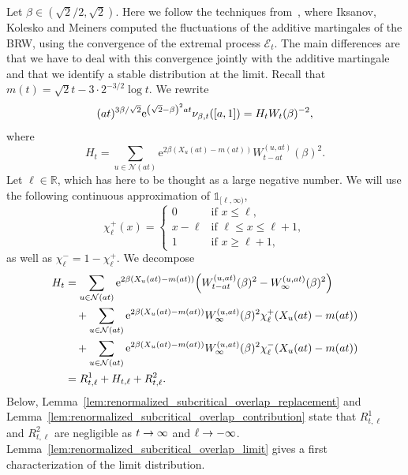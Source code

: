 \documentclass[10pt]{amsart}
\theoremstyle{definition}\newtheorem{defi}[theo]{Definition}\newtheorem{rema}[theo]{Remark}\newtheorem{exam}[theo]{Example}\newtheorem{exem}[theo]{Example}\newtheorem{nota}[theo]{Notation}
\newcommand{\e}{\mathrm{e}}
\newcommand{\R}{\mathbb{R}}
\newcommand\1{\mathds{1}}
\newcommand{\cE}{\mathcal{E}}
\newcommand{\cN}{\mathcal{N}}
\let\originalleft\left
\let\originalright\right
\renewcommand{\left}{\mathopen{}\mathclose\bgroup\originalleft}
\renewcommand{\right}{\aftergroup\egroup\originalright}
\renewcommand*{\to}{\mathchoice{\longrightarrow}{\rightarrow}{\rightarrow}{\rightarrow}}
\begin{document}
Let $\beta \in (\sqrt{2}/2, \sqrt{2})$. Here we follow the techniques from~\cite[Theorem~2.5]{IksanovKoleskoMeiners2020}, where Iksanov, Kolesko and Meiners computed the fluctuations of the additive martingales of the BRW, using the convergence of the extremal process $\cE_t$. The main differences are that we have to deal with this convergence jointly with the additive martingale and that we identify a stable distribution at the limit. Recall that $m(t) = \sqrt{2}t - 3 \cdot 2^{-3/2} \log t$. We rewrite
\begin{equation*}
(at)^{3 \beta/\sqrt{2}} \e^{\left(\sqrt{2} - \beta\right)^2 at} \nu_{\beta,t}([a, 1]) = H_t W_t(\beta)^{-2},
\end{equation*}
where
\begin{equation*}
H_t = \sum_{u \in \cN(at)} \e^{2 \beta (X_u(at) - m(at))} W_{t - at}^{(u, at)}(\beta)^2.
\end{equation*}
Let $\ell \in \R$, which has here to be thought as a large negative number. We will use the following continuous approximation of $\1_{[\ell, \infty)}$,
\begin{equation*}
\chi_\ell^+(x) =
\begin{cases}
0 & \text{if } x \leq \ell, \\
x - \ell &\text{if } \ell \leq x \leq \ell+1, \\
1 & \text{if } x \geq \ell+1,
\end{cases}
\end{equation*}
as well as $\chi_\ell^- = 1 - \chi_\ell^+$. We decompose
\begin{align*}
H_t &= \sum_{u \in \cN(at)} \e^{2 \beta (X_u(at) - m(at))} \left(W_{t - at}^{(u, at)}(\beta)^2 - W_\infty^{(u, at)}(\beta)^2\right)  \\
&\quad + \sum_{u \in \cN(at)} \e^{2 \beta (X_u(at) - m(at))} W_\infty^{(u, at)}(\beta)^2 \chi_\ell^+(X_u(at) - m(at))  \\
&\quad + \sum_{u \in \cN(at)} \e^{2 \beta (X_u(at) - m(at))} W_\infty^{(u, at)}(\beta)^2 \chi_\ell^-(X_u(at) - m(at))  \\
&= R_{t, \ell}^1 + H_{t, \ell} + R_{t, \ell}^2. 
\end{align*}
Below, Lemma~\ref{lem:renormalized_subcritical_overlap_replacement} and Lemma~\ref{lem:renormalized_subcritical_overlap_contribution} state that $R_{t, \ell}^1$ and $R_{t, \ell}^2$ are negligible as $t \to \infty$ and $\ell \to -\infty$. Lemma~\ref{lem:renormalized_subcritical_overlap_limit} gives a first characterization of the limit distribution.
\end{document}
